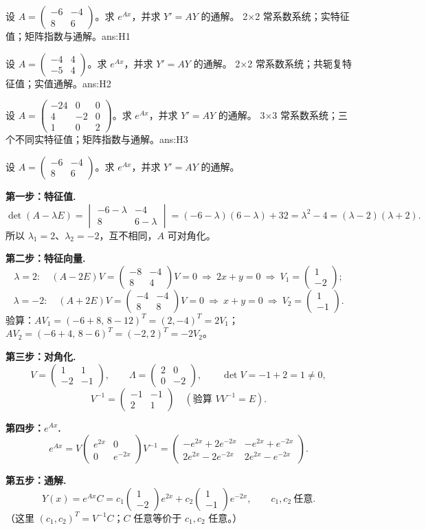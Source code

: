 \documentclass[11pt]{ctexart}
\newcommand{\pmat}[1]{\begin{pmatrix}#1\end{pmatrix}}
\begin{document}
%
{设 $A=\pmat{-6&-4\\8&6}$。求 $e^{Ax}$，并求 $Y'=AY$ 的通解。}%
{2×2 常系数系统；实特征值；矩阵指数与通解。}{ans:H1}

%
{设 $A=\pmat{-4&4\\-5&4}$。求 $e^{Ax}$，并求 $Y'=AY$ 的通解。}%
{2×2 常系数系统；共轭复特征值；实值通解。}{ans:H2}

%
{设 $A=\pmat{-24&0&0\\4&-2&0\\1&0&2}$。求 $e^{Ax}$，并求 $Y'=AY$ 的通解。}%
{3×3 常系数系统；三个不同实特征值；矩阵指数与通解。}{ans:H3}

\clearpage
\appendix
{}

%
{设 $A=\pmat{-6&-4\\8&6}$。求 $e^{Ax}$，并求 $Y'=AY$ 的通解。}

\textbf{第一步：特征值.}
\[
\det(A-\lambda E)=\begin{vmatrix}-6-\lambda&-4\\8&6-\lambda\end{vmatrix}
=(-6-\lambda)(6-\lambda)+32=\lambda^2-4=(\lambda-2)(\lambda+2).
\]
所以 $\lambda_1=2$、$\lambda_2=-2$，互不相同，$A$ 可对角化。

\textbf{第二步：特征向量.}
\[
\lambda=2:\quad (A-2E)V=\pmat{-8&-4\\8&4}V=0\ \Rightarrow\ 2x+y=0\ \Rightarrow\ V_1=\pmat{1\\-2};
\]
\[
\lambda=-2:\quad (A+2E)V=\pmat{-4&-4\\8&8}V=0\ \Rightarrow\ x+y=0\ \Rightarrow\ V_2=\pmat{1\\-1}.
\]
验算：$AV_1=(-6+8,\,8-12)^T=(2,-4)^T=2V_1$；
$AV_2=(-6+4,\,8-6)^T=(-2,2)^T=-2V_2$。

\textbf{第三步：对角化.}
\[
V=\pmat{1&1\\-2&-1},\qquad \Lambda=\pmat{2&0\\0&-2},\qquad
\det V=-1+2=1\ne0,
\]
\[
V^{-1}=\pmat{-1&-1\\2&1}
\quad(\text{验算 }VV^{-1}=E).
\]

\textbf{第四步：$e^{Ax}$.}
\[
e^{Ax}=V\pmat{e^{2x}&0\\0&e^{-2x}}V^{-1}
=\pmat{-e^{2x}+2e^{-2x}&-e^{2x}+e^{-2x}\\[2pt]2e^{2x}-2e^{-2x}&2e^{2x}-e^{-2x}}.
\]

\textbf{第五步：通解.}
\[
Y(x)=e^{Ax}C
=c_1\pmat{1\\-2}e^{2x}+c_2\pmat{1\\-1}e^{-2x},\qquad c_1,c_2\ \text{任意}.
\]
（这里 $(c_1,c_2)^T=V^{-1}C$；$C$ 任意等价于 $c_1,c_2$ 任意。）
\end{document}
